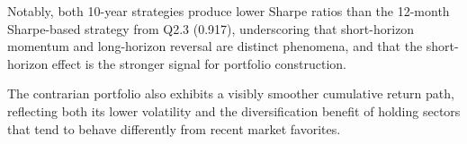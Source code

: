 \documentclass[10pt]{article}
\begin{document}
Notably, both 10-year strategies produce lower Sharpe ratios than the 12-month Sharpe-based strategy from Q2.3 (0.917), underscoring that short-horizon momentum and long-horizon reversal are distinct phenomena, and that the short-horizon effect is the stronger signal for portfolio construction. 

The contrarian portfolio also exhibits a visibly smoother cumulative return path, reflecting both its lower volatility and the diversification benefit of holding sectors that tend to behave differently from recent market favorites. 
\end{document}

